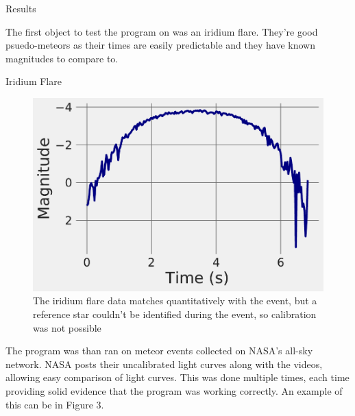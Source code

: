\documentclass[final]{beamer}
\newlength{\onecolwid}
\newlength{\twocolwid}
\begin{document}
\begin{frame}[t]
\begin{columns}[t]



\begin{column}{\onecolwid} %


\begin{block}{Results}

The first object to test the program on was an iridium flare. They're good psuedo-meteors as their times are easily predictable and they have known magnitudes to compare to.

\end{block}
\begin{alertblock}{Iridium Flare}

\begin{figure}
\includegraphics[width=0.8\linewidth]{IridiumCurve.pdf}
\caption{The iridium flare data matches quantitatively with the event, but a reference star couldn't be identified during the event, so calibration was not possible}
\end{figure}

\end{alertblock}

\vspace{-1.5cm}
\begin{block}{}
The program was than ran on meteor events collected on NASA's all-sky network. NASA posts their uncalibrated light curves along with the videos, allowing easy comparison of light curves. This was done multiple times, each time providing solid evidence that the program was working correctly. An example of this can be in Figure 3. 
\end{block}


\end{column}
\end{columns}
\end{frame}
\end{document}
